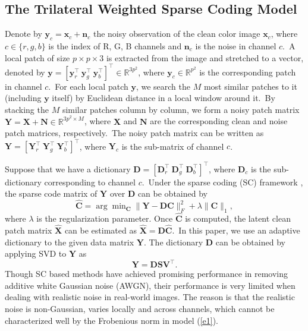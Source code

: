 \subsection{The Trilateral Weighted Sparse Coding Model}

Denote by $\bm{y}_{c}=\bm{x}_{c}+\bm{n}_{c}$ the noisy observation of the clean color image $\bm{x}_{c}$, where $c\in\{r, g, b\}$ is the index of R, G, B channels and $\bm{n}_{c}$ is the noise in channel $c$.\ A local patch of size $p\times p \times 3$ is extracted from the image and stretched to a vector, denoted by $\bm{y}=[\bm{y}_{r}^{\top}\ \bm{y}_{g}^{\top}\ \bm{y}_{b}^{\top}]^{\top}\in\mathbb{R}^{3p^{2}}$, where $\bm{y}_{c}\in\mathbb{R}^{p^{2}}$ is the corresponding patch in channel $c$.\ For each local patch $\bm{y}$, we search the $M$ most similar patches to it (including $\bm{y}$ itself) by Euclidean distance in a local window around it.\ By stacking the $M$ similar patches column by column, we form a noisy patch matrix $\bm{Y}=\bm{X}+\bm{N}\in\mathbb{R}^{3p^{2}\times M}$, where $\bm{X}$ and $\bm{N}$ are the corresponding clean and noise patch matrices, respectively.\ The noisy patch matrix can be written as $\bm{Y}=[\bm{Y}_{r}^{\top}\ \bm{Y}_{g}^{\top}\ \bm{Y}_{b}^{\top}]^{\top}$, where $\bm{Y}_{c}$ is the sub-matrix of channel $c$.\ 

Suppose that we have a dictionary $\bm{D}=[\bm{D}_{r}^{\top}\ \bm{D}_{g}^{\top}\ \bm{D}_{b}^{\top}]^{\top}$, where $\bm{D}_{c}$ is the sub-dictionary corresponding to channel $c$.\ Under the sparse coding (SC) framework \cite{lasso}, the sparse code matrix of $\bm{Y}$ over $\bm{D}$ can be obtained by
\begin{equation}
\label{e1}
\hat{\bm{C}}
=
\arg\min\nolimits_{\bm{C}}
\|\bm{Y}-\bm{D}\bm{C}\|_{F}^{2}
+
\lambda\|\bm{C}\|_{1},
\end{equation}
where $\lambda$ is the regularization parameter. Once $\hat{\bm{C}}$ is computed,
the latent clean patch matrix $\hat{\bm{X}}$ can be estimated as $\hat{\bm{X}}=\bm{D}\hat{\bm{C}}$.\ In this paper, we use an adaptive dictionary to the given data matrix $\bm{Y}$. The dictionary $\bm{D}$ can be obtained by applying SVD to $\bm{Y}$ as 
\begin{equation}
\label{e2}
\bm{Y} =\bm{D}\bm{S}\bm{V}^{\top}.
\end{equation}
Though SC based methods \cite{ksvd,lssc,ncsr} have achieved promising performance in removing additive white Gaussian noise (AWGN), their performance is very limited when dealing with realistic noise in real-world images. The reason is that the realistic noise is non-Gaussian, varies locally and across channels, which cannot be characterized well by the Frobenious norm in model (\ref{e1}).  

